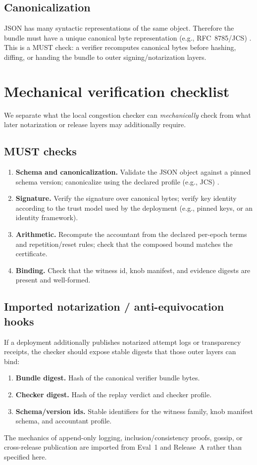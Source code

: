 \documentclass[11pt]{article}
\begin{document}
\subsection{Canonicalization}
JSON has many syntactic representations of the same object.
Therefore the bundle must have a unique canonical byte representation (e.g., RFC~8785/JCS) \cite{rfc8785}.
This is a MUST check: a verifier recomputes canonical bytes before hashing, diffing, or handing the bundle to outer signing/notarization layers.

\section{Mechanical verification checklist}
We separate what the local congestion checker can \emph{mechanically} check from what later notarization or release layers may additionally require.

\subsection{MUST checks}
\begin{enumerate}[leftmargin=1.6em]
\item \textbf{Schema and canonicalization.} Validate the JSON object against a pinned schema version; canonicalize using the declared profile (e.g., JCS) \cite{rfc8785}.
\item \textbf{Signature.} Verify the signature over canonical bytes; verify key identity according to the trust model used by the deployment (e.g., pinned keys, or an identity framework).
\item \textbf{Arithmetic.} Recompute the accountant from the declared per-epoch terms and repetition/reset rules; check that the composed bound matches the certificate.
\item \textbf{Binding.} Check that the witness id, knob manifest, and evidence digests are present and well-formed.
\end{enumerate}

\subsection{Imported notarization / anti-equivocation hooks}
If a deployment additionally publishes notarized attempt logs or transparency receipts, the checker should expose stable digests that those outer layers can bind:
\begin{enumerate}[leftmargin=1.6em]
\item \textbf{Bundle digest.} Hash of the canonical verifier bundle bytes.
\item \textbf{Checker digest.} Hash of the replay verdict and checker profile.
\item \textbf{Schema/version ids.} Stable identifiers for the witness family, knob manifest schema, and accountant profile.
\end{enumerate}
The mechanics of append-only logging, inclusion/consistency proofs, gossip, or cross-release publication are imported from Eval~1 and Release~A rather than specified here.\cite{series:evalnotary,series:release}
\end{document}
